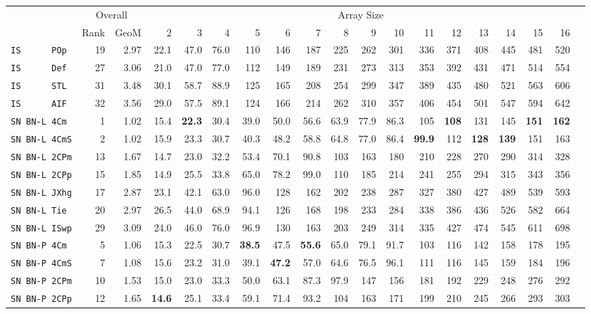 \begin{tabular}{l | r @{~~} r | r@{~~}r@{~~}r@{~~}r@{~~}r@{~~}r@{~~}r@{~~}r@{~~}r@{~~}r@{~~}r@{~~}r@{~~}r@{~~}r@{~~}r@{~~}r|}
 & \multicolumn{2}{c|}{Overall} & \multicolumn{15}{c}{Array Size} \\
 & Rank & GeoM & 2&3&4&5&6&7&8&9&10&11&12&13&14&15&16\\ \hline
\verb+IS      POp+ & 19 & 2.97 & 22.1&47.0&76.0&110&146&187&225&262&301&336&371&408&445&481&520\\
\verb+IS      Def+ & 27 & 3.06 & 21.0&47.0&77.0&112&149&189&231&273&313&353&392&431&471&514&554\\
\verb+IS      STL+ & 31 & 3.48 & 30.1&58.7&88.9&125&165&208&254&299&347&389&435&480&521&563&606\\
\verb+IS      AIF+ & 32 & 3.56 & 29.0&57.5&89.1&124&166&214&262&310&357&406&454&501&547&594&642\smallskip \\
\verb+SN BN-L 4Cm + & 1 & 1.02 & 15.4&\textbf{22.3}&30.4&39.0&50.0&56.6&63.9&77.9&86.3&105&\textbf{108}&131&145&\textbf{151}&\textbf{162}\\
\verb+SN BN-L 4CmS+ & 2 & 1.02 & 15.9&23.3&30.7&40.3&48.2&58.8&64.8&77.0&86.4&\textbf{99.9}&112&\textbf{128}&\textbf{139}&151&163\\
\verb+SN BN-L 2CPm+ & 13 & 1.67 & 14.7&23.0&32.2&53.4&70.1&90.8&103&163&180&210&228&270&290&314&328\\
\verb+SN BN-L 2CPp+ & 15 & 1.85 & 14.9&25.5&33.8&65.0&78.2&99.0&110&185&214&241&255&294&315&343&356\\
\verb+SN BN-L JXhg+ & 17 & 2.87 & 23.1&42.1&63.0&96.0&128&162&202&238&287&327&380&427&489&539&593\\
\verb+SN BN-L Tie + & 20 & 2.97 & 26.5&44.0&68.9&94.1&126&168&198&233&284&338&386&436&526&582&664\\
\verb+SN BN-L ISwp+ & 29 & 3.09 & 24.0&46.0&76.0&96.9&130&163&203&249&314&335&427&474&545&611&698\smallskip \\
\verb+SN BN-P 4Cm + & 5 & 1.06 & 15.3&22.5&30.7&\textbf{38.5}&47.5&\textbf{55.6}&65.0&79.1&91.7&103&116&142&158&178&195\\
\verb+SN BN-P 4CmS+ & 7 & 1.08 & 15.6&23.2&31.0&39.1&\textbf{47.2}&57.0&64.6&76.5&96.1&111&116&145&159&184&196\\
\verb+SN BN-P 2CPm+ & 10 & 1.53 & 15.0&23.0&33.3&50.0&63.1&87.3&97.9&147&156&181&192&229&248&276&292\\
\verb+SN BN-P 2CPp+ & 12 & 1.65 & \textbf{14.6}&25.1&33.4&59.1&71.4&93.2&104&163&171&199&210&245&266&293&303\\

\end{tabular}
